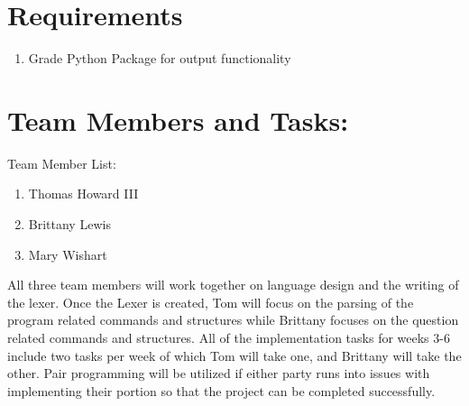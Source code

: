 \documentclass{article}
\begin{document}
    \section{Requirements}
    \begin{enumerate}
        \item Grade Python Package for output functionality
    \end{enumerate}
    
    \section {Team Members and Tasks:}
    Team Member List:
    
    \begin{enumerate}
        \item Thomas Howard III
        \item Brittany Lewis
        \item Mary Wishart
    \end{enumerate}
    
    All three team members will work together on language design and the writing of the lexer. Once the Lexer is created, Tom will focus on the parsing of the program related commands and structures while Brittany focuses on the question related commands and structures. All of the implementation tasks for weeks 3-6 include two tasks per week of which Tom will take one, and Brittany will take the other. Pair programming will be utilized if either party runs into issues with implementing their portion so that the project can be completed successfully.
\end{document}
